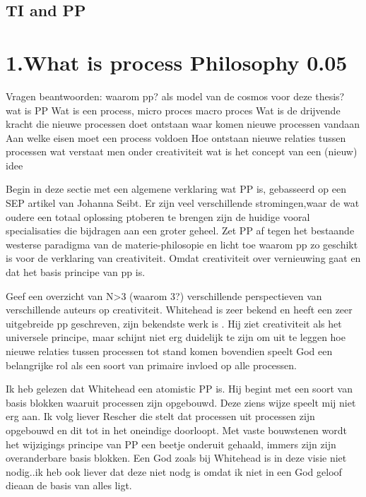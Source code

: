 \documentclass[a4paper]{Thesis}
\begin{document}
	\subsection{TI and PP}
	
	
	
	

\section{1.What is process Philosophy 0.05}

Vragen beantwoorden:
waarom pp? als model van de cosmos voor deze thesis?
wat is PP
Wat is een process, micro proces macro proces
Wat is de drijvende kracht die nieuwe processen doet ontstaan
waar komen nieuwe processen vandaan
Aan welke eisen moet een process voldoen
Hoe ontstaan nieuwe relaties tussen processen
wat verstaat men onder creativiteit
wat is het concept van een (nieuw) idee

Begin in deze sectie met een algemene verklaring wat PP is, gebasseerd op een SEP artikel van Johanna Seibt. Er zijn veel verschillende stromingen,waar de wat oudere een totaal oplossing ptoberen te brengen zijn de huidige vooral specialisaties die bijdragen aan een groter geheel.
Zet PP af tegen het bestaande westerse paradigma van de materie-philosopie en licht toe waarom pp zo geschikt is voor de verklaring van creativiteit. Omdat creativiteit over vernieuwing gaat en dat het basis principe van pp is.

Geef een overzicht van N>3 (waarom 3?) verschillende perspectieven van verschillende auteurs op creativiteit. Whitehead is zeer bekend en heeft een zeer uitgebreide pp geschreven, zijn bekendste werk is \cite{whitehead1929process}. Hij ziet creativiteit als het universele principe, maar schijnt niet erg duidelijk te zijn om uit te leggen hoe nieuwe relaties tussen processen tot stand komen bovendien speelt God een belangrijke rol als een soort van primaire invloed op alle processen.

Ik heb gelezen dat Whitehead een atomistic PP is. Hij begint met een soort van basis blokken waaruit processen zijn opgebouwd. Deze ziens wijze speelt mij niet erg aan. Ik volg liever Rescher die stelt dat processen uit processen zijn opgebouwd en dit tot in het oneindige doorloopt. Met vaste bouwstenen wordt het wijzigings principe van PP een beetje onderuit gehaald, immers zijn zijn overanderbare basis blokken. Een God zoals bij Whitehead is in deze visie niet nodig..ik heb ook liever dat deze niet nodg is omdat ik niet in een God geloof dieaan de basis van alles ligt.
\end{document}
